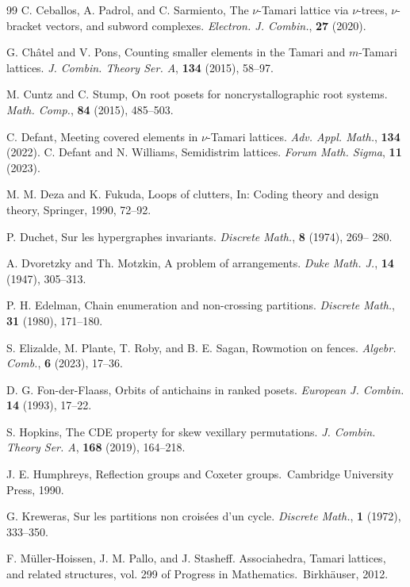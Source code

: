 \documentclass[11pt]{amsart}
\theoremstyle{definition}
\begin{document}
\begin{thebibliography}{99}
C. Ceballos, A. Padrol, and C. Sarmiento, The $\nu$-Tamari lattice via $\nu$-trees, $\nu$-bracket vectors, and subword complexes. \emph{Electron. J. Combin.}, {\bf 27} (2020). 

G. Ch\^atel and V. Pons, Counting smaller elements in the Tamari and $m$-Tamari lattices. \emph{J. Combin. Theory Ser. A}, {\bf 134} (2015), 58--97. 

M. Cuntz and C. Stump, On root posets for noncrystallographic root systems. \emph{Math. Comp.}, {\bf 84} (2015), 485--503.  

C. Defant, Meeting covered elements in $\nu$-Tamari lattices. \emph{Adv. Appl. Math.}, {\bf 134} (2022). 
C. Defant and N. Williams, Semidistrim lattices. \emph{Forum Math. Sigma}, {\bf 11} (2023). 

M. M. Deza and K. Fukuda, Loops of clutters, In: Coding theory and design theory, Springer, 1990, 72--92.

P. Duchet, Sur les hypergraphes invariants. \emph{Discrete Math.}, {\bf 8} (1974), 269--
280.

A. Dvoretzky and Th. Motzkin, A problem of arrangements. \emph{Duke Math. J.}, {\bf 14} (1947), 305--313.

P. H. Edelman, Chain enumeration and non-crossing partitions. \emph{Discrete Math.}, {\bf 31} (1980), 171--180. 

S. Elizalde, M. Plante, T. Roby, and B. E. Sagan, Rowmotion on fences. \emph{Algebr. Comb.}, {\bf 6} (2023), 17--36.  

D. G. Fon-der-Flaass, Orbits of antichains in ranked posets. \emph{European J.
Combin.} {\bf 14} (1993), 17--22.

S. Hopkins, The CDE property for skew vexillary permutations. \emph{J. Combin. Theory Ser. A}, {\bf 168} (2019), 164--218. 

J. E. Humphreys, Reflection groups and Coxeter groups.\ Cambridge University Press, 1990. 

G. Kreweras, Sur les partitions non crois\'ees d'un cycle. \emph{Discrete Math.}, {\bf 1} (1972), 333--350.

F. M\"uller-Hoissen, J. M. Pallo, and J. Stasheff. Associahedra, Tamari lattices, and related structures, vol. 299 of Progress in Mathematics.\ Birkh\"auser, 2012.  


\end{thebibliography}
\end{document}
